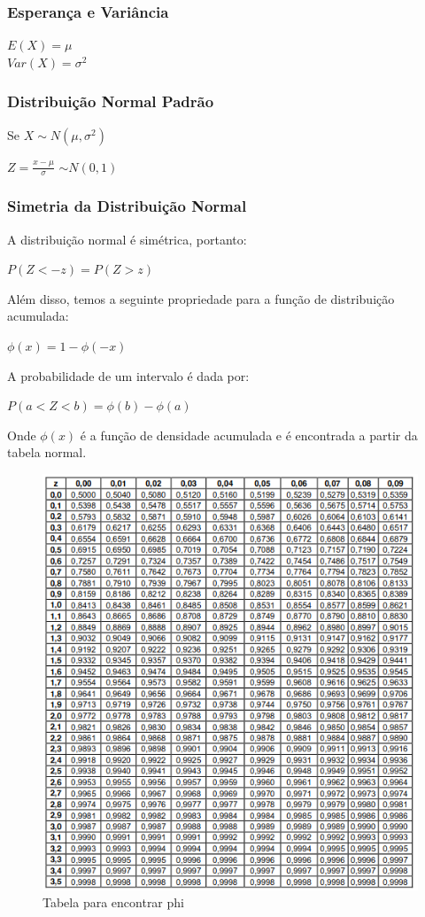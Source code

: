 \documentclass[a4paper, 12pt]{article}
\begin{document}
\subsubsection{Esperança e Variância}
	\begin{center}
		\Large
		$
		E(X) = \mu
		$\\
		$
		Var(X) = \sigma^2
		$
	\end{center}

\subsubsection{Distribuição Normal Padrão}
	Se $X \sim N(\mu, \sigma^2)$\\
	\begin{center}
		\Large
		$
		Z = \frac{x-\mu}{\sigma}
		$ $\sim N(0,1)$
	\end{center}
	
\subsubsection{Simetria da Distribuição Normal}
	A distribuição normal é simétrica, portanto:
	\begin{center}
		\Large
		$
		P(Z < -z) = P(Z > z)
		$
	\end{center}
	Além disso, temos a seguinte propriedade para a função de distribuição acumulada:
	\begin{center}
		\Large
		$
		\phi (x) = 1 - \phi (-x)
		$
	\end{center}
 	A probabilidade de um intervalo é dada por:
 	\begin{center}
 		\Large
 		$
 		P(a<Z<b) = \phi (b) - \phi (a)
 		$
 	\end{center}
	Onde $\phi (x)$ é a função de densidade acumulada e é encontrada a partir da tabela normal.
	\begin{figure}[h]
		\centering
		\includegraphics[width=0.9\linewidth]{imagens/tabelaNormal}
		\caption{Tabela para encontrar phi}
		\label{fig:tabelanormal}
	\end{figure}
	
\end{document}
